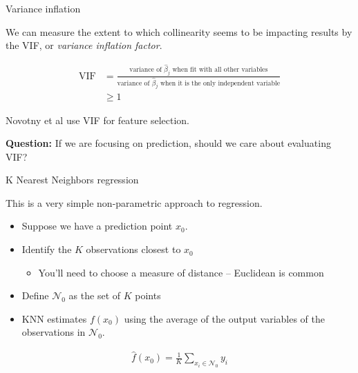 \documentclass[aspectratio=169]{beamer}
\begin{document}
\begin{frame}{Variance inflation}

We can measure the extent to which collinearity seems to be impacting results by the VIF, or \textit{variance inflation factor}.

\begin{align*}
\text{VIF} &= \frac{\text{variance of $\hat{\beta}_j$ when fit with all other variables}}{\text{variance of $\hat{\beta}_j$ when it is the only independent variable}}\\
&\geq 1
\end{align*}

\vspace{5mm}

Novotny et al use VIF for feature selection.

\vspace{5mm}

\textbf{Question:} If we are focusing on prediction, should we care about evaluating VIF?


\end{frame}

\begin{frame}{K Nearest Neighbors regression}

This is a very simple non-parametric approach to regression.
\begin{itemize}
  \item Suppose we have a prediction point $x_0$.
  \item Identify the $K$ observations closest to $x_0$ 
  \begin{itemize}
    \item You'll need to choose a measure of distance -- Euclidean is common
  \end{itemize}
  \item Define $\mathcal{N}_0$ as the set of $K$ points
  \item KNN estimates $f(x_0)$ using the average of the output variables of the observations in $\mathcal{N}_0$.
\end{itemize}

\begin{align*}
  \hat{f}(x_0) = \frac{1}{K} \sum_{x_i \in \mathcal{N}_0} y_i
\end{align*}

\end{frame}
\end{document}
